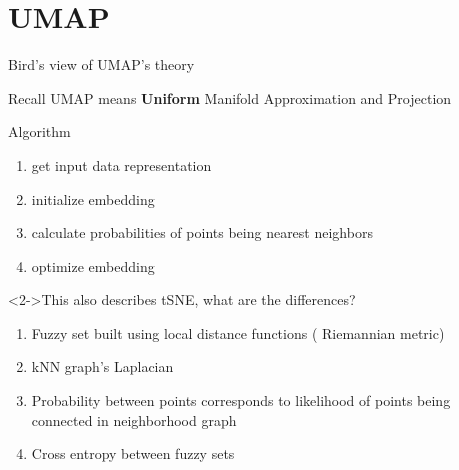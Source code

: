 \documentclass[unknownkeysallowed]{beamer}
\begin{document}
\section{UMAP}


\begin{frame}{Bird's view of UMAP's theory}

	\begin{flushleft}
	Recall UMAP means \textbf{Uniform} Manifold Approximation and Projection
	\end{flushleft}

	
	\begin{block}{Algorithm}
		\begin{enumerate}
		\item get input data representation
		\item initialize embedding
		\item calculate probabilities of points being nearest neighbors
		\item optimize  embedding
		\end{enumerate}
	\end{block}
	\begin{block}<2->{This also describes tSNE, what are the differences?}
	\begin{enumerate}
		\item Fuzzy set built using local distance functions ( Riemannian metric)
		\item kNN graph's Laplacian
		\item Probability between points corresponds to likelihood of points being connected in neighborhood graph
		\item Cross entropy between fuzzy sets
	\end{enumerate}
	\end{block}

\end{frame}
\end{document}
